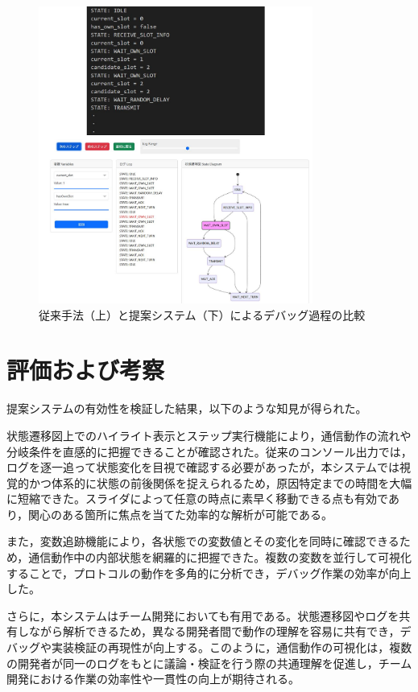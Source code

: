 \documentclass[technicalreport]{ieicej}
\begin{document}
\begin{figure}[h]
  \centering
  \includegraphics[width=90mm]{./images/3_debug_comparison.pdf}
  \caption{従来手法（上）と提案システム（下）によるデバッグ過程の比較}
  \label{fig:debug-comparison}
\end{figure}




\section{評価および考察}
提案システムの有効性を検証した結果，以下のような知見が得られた。

状態遷移図上でのハイライト表示とステップ実行機能により，通信動作の流れや分岐条件を直感的に把握できることが確認された。従来のコンソール出力では，ログを逐一追って状態変化を目視で確認する必要があったが，本システムでは視覚的かつ体系的に状態の前後関係を捉えられるため，原因特定までの時間を大幅に短縮できた。スライダによって任意の時点に素早く移動できる点も有効であり，関心のある箇所に焦点を当てた効率的な解析が可能である。

また，変数追跡機能により，各状態での変数値とその変化を同時に確認できるため，通信動作中の内部状態を網羅的に把握できた。複数の変数を並行して可視化することで，プロトコルの動作を多角的に分析でき，デバッグ作業の効率が向上した。

さらに，本システムはチーム開発においても有用である。状態遷移図やログを共有しながら解析できるため，異なる開発者間で動作の理解を容易に共有でき，デバッグや実装検証の再現性が向上する。このように，通信動作の可視化は，複数の開発者が同一のログをもとに議論・検証を行う際の共通理解を促進し，チーム開発における作業の効率性や一貫性の向上が期待される。
\end{document}
